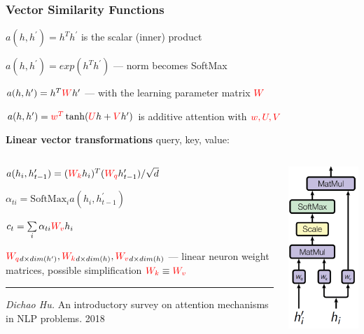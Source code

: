 \documentclass[fullscreen=true, bookmarks=true, hyperref={pdfencoding=unicode}]{beamer}
\begin{document}
\begin{frame}
\frametitle{Vector Similarity Functions}

         $a(h, h^\prime) = h^T h^\prime$ is the scalar (inner) product

         $a(h, h^\prime) = exp(h^T h^\prime)$ — norm becomes SoftMax

         $a(h, h^\prime) = h^T {\color{red}W} h^\prime$ — with the learning parameter matrix $\color{red}{W}$

         $a(h, h^\prime) = {\color{red}w^T} \tanh ({\color{red}U}h + {\color{red}V} h^\prime)$ is additive attention with ${\color{red}w, U, V}$

         \vspace{0.5cm}
         {\bf Linear vector transformations} query, key, value:

    \begin{columns}
      \begin{column}{.6\paperwidth}
        $a(h_i, h^\prime_{t-1}) = ({\color{red}W_k}h_i)^T ({\color{red}W_q}h^\prime_{t-1}) / \sqrt{d}$

        $\alpha_{ti} = \text{SoftMax}_i a(h_i, h^\prime_{t-1})$

        $c_t = \sum\limits_i \alpha_{ti} {\color{red}W_v} h_i $

        ${\color{red}W_q}_{d \times dim(h^\prime)}, {\color{red}W_k}_{d \times dim(h)}, {\color{red}W_v} _{d \times dim(h)}$ — linear neuron weight matrices,
         possible simplification ${\color{red}W_k} \equiv {\color{red}W_v}$
         {\footnotesize
         \noindent\rule{8cm}{0.4pt}

         {\it Dichao Hu.} An introductory survey on attention mechanisms in NLP problems. 2018}
      \end{column}
      \begin{column}{.18\paperwidth}
        \includegraphics[keepaspectratio,
                         width=.15\paperwidth]{general_attention.png}
      \end{column}
    \end{columns}
\end{frame}
\end{document}

